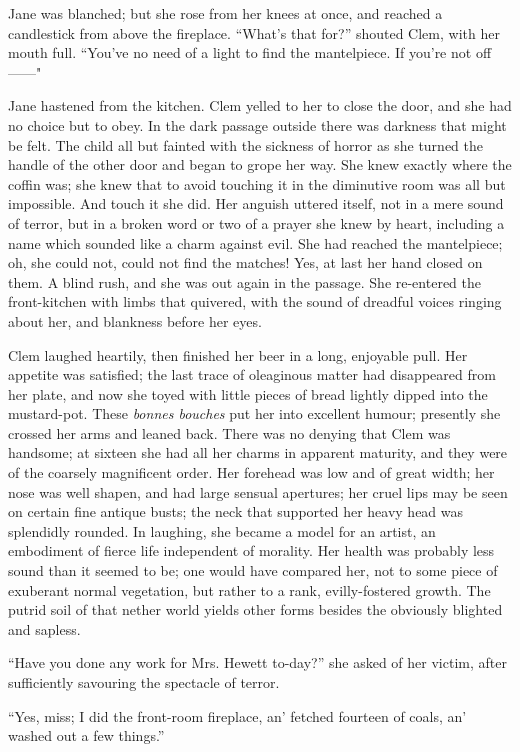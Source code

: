 Jane was blanched; but she rose from her knees at once, and reached a
candlestick from above the fireplace. ``What's that for?'' shouted Clem,
with her mouth full. ``You've no need of a light to find the
mantelpiece. If you're not off{{------}}"

Jane hastened from the kitchen. Clem yelled to her to close the door,
and she had no choice but to obey. In the dark passage outside there was
darkness that might be felt. The child all but fainted with the
{}sickness of horror as she turned the handle of the other door and
began to grope her way. She knew exactly where the coffin was; she knew
that to avoid touching it in the diminutive room was all but impossible.
And touch it she did. Her anguish uttered itself, not in a mere sound of
terror, but in a broken word or two of a prayer she knew by heart,
including a name which sounded like a charm against evil. She had
reached the mantelpiece; oh, she could not, could not find the matches!
Yes, at last her hand closed on them. A blind rush, and she was out
again in the passage. She re-entered the front-kitchen with limbs that
quivered, with the sound of dreadful voices ringing about her, and
blankness before her eyes.

Clem laughed heartily, then finished her beer in a long, enjoyable pull.
Her appetite was satisfied; the last trace of oleaginous matter had
disappeared from her plate, and now she toyed with little pieces of
bread lightly dipped into the mustard-pot. These {}\emph{bonnes bouches}
put her into excellent humour; presently she crossed her arms and leaned
back. There was no denying that Clem was handsome; at sixteen she had
all her charms in apparent maturity, and they were of the coarsely
magnificent order. Her forehead was low and of great width; her nose was
well shapen, and had large sensual apertures; her cruel lips may be seen
on certain fine antique busts; the neck that supported her heavy head
was splendidly rounded. In laughing, she became a model for an artist,
an embodiment of fierce life independent of morality. Her health was
probably less sound than it seemed to be; one would have compared her,
not to some piece of exuberant normal vegetation, but rather to a rank,
evilly-fostered growth. The putrid soil of that nether world yields
other forms besides the obviously blighted and sapless.

``Have you done any work for Mrs. Hewett to-day?'' she asked of her
victim, after sufficiently savouring the spectacle of terror.

{}``Yes, miss; I did the front-room fireplace, an' fetched fourteen of
coals, an' washed out a few things.''

